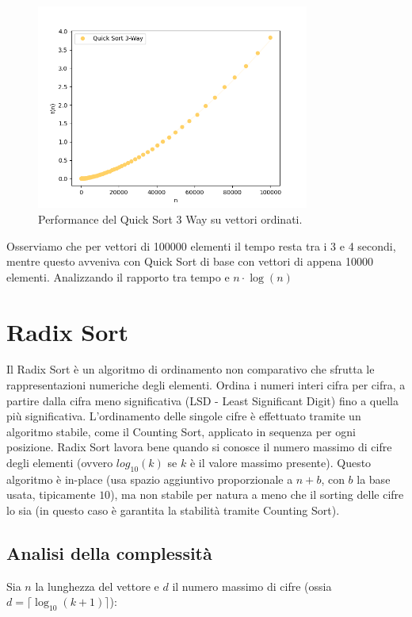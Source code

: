 \documentclass[a4paper, 12pt, oneside]{book}
\begin{document}
\begin{figure}[H]
    \centering
    \includegraphics[width=0.8\textwidth]{images/quicksort3wayCasoPeggiore.png}
    \caption{Performance del Quick Sort 3 Way su vettori ordinati.}
    \label{fig:quick_sort_3_way_m}
\end{figure}

\noindent
Osserviamo che per vettori di 100000 elementi il tempo resta tra i 3 e 4 secondi, mentre questo avveniva con Quick Sort di base con vettori di appena 10000 elementi. Analizzando il rapporto tra tempo e $n \cdot \log (n)$ 



\chapter{Radix Sort}\label{chap:Radix Sort} %

Il Radix Sort è un algoritmo di ordinamento non comparativo che sfrutta le rappresentazioni numeriche degli elementi. Ordina i numeri interi cifra per cifra, a partire dalla cifra meno significativa (LSD - Least Significant Digit) fino a quella più significativa. L'ordinamento delle singole cifre è effettuato tramite un algoritmo stabile, come il Counting Sort, applicato in sequenza per ogni posizione.
Radix Sort lavora bene quando si conosce il numero massimo di cifre degli elementi (ovvero \(log_{10}(k)\) se \(k\) è il valore massimo presente).
Questo algoritmo è in-place (usa spazio aggiuntivo proporzionale a \(n + b\), con \(b\) la base usata, tipicamente \(10\)), ma non stabile per natura a meno che il sorting delle cifre lo sia (in questo caso è garantita la stabilità tramite Counting Sort).

\section{Analisi della complessità}
Sia \(n\) la lunghezza del vettore e \(d\) il numero massimo di cifre (ossia \( d = \lceil \log_{10}(k + 1) \rceil \)): \\
\end{document}
